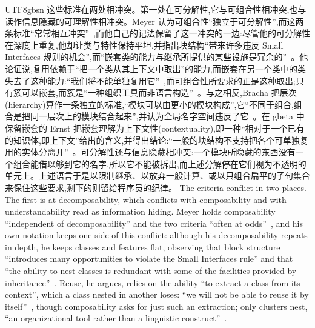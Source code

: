 \begin{CJK*}{UTF8}{gbsn}
这些标准在两处相冲突。第一处在可分解性,它与可组合性相冲突,也与读作信息隐藏的可理解性相冲突。Meyer 认为可组合性``独立于可分解性'',而这两条标准``常常相互冲突''~\cite[第~43~页]{meyer1997-object-oriented-software-construction},而他自己的记法保留了这一冲突的一边:尽管他的可分解性在深度上重复,他却让类与特性保持平坦,并指出块结构``带来许多违反 Small Interfaces 规则的机会'',而``嵌套类的能力与继承所提供的某些设施是冗余的''~\cite[第~49--50~页]{meyer1997-object-oriented-software-construction}。他论证说,复用依赖于``把一个类从其上下文中取出''的能力,而嵌套在另一个类中的类失去了这种能力:``我们将不能单独复用它''~\cite[第~209~页]{meyer1997-object-oriented-software-construction},而可组合性所要求的正是这种取出;只有簇可以嵌套,而簇是``一种组织工具而非语言构造''~\cite[第~50~页]{meyer1997-object-oriented-software-construction}。与之相反,Bracha 把层次(hierarchy)算作一条独立的标准,``模块可以由更小的模块构成'',它``不同于组合,组合是把同一层次上的模块结合起来'',并认为全局名字空间违反了它~\cite[第~13、16~页]{bracha1992-jigsaw-mixins}。在 gbeta 中保留嵌套的 Ernst 把嵌套理解为上下文性(contextuality),即一种``相对于一个已有的知识体,即上下文''给出的含义,并得出结论:``一般的块结构不支持把各个可单独复用的实体分离开''~\cite[第~104、117~页]{ernst1999-gbeta}。可分解性还与信息隐藏相冲突:一个模块所隐藏的东西没有一个组合能借以够到它的名字,所以它不能被拆出,而上述分解停在它们视为不透明的单元上。上述语言于是以限制继承、以放弃一般计算、或以只组合扁平的子句集合来保住这些要求,剩下的则留给程序员的纪律。
\else
The criteria conflict in two places.
The first is at decomposability, which conflicts with composability and with understandability read as
information hiding.
Meyer holds composability ``independent of decomposability'' and the two criteria ``often at
odds''~\cite[p.~43]{meyer1997-object-oriented-software-construction}, and his own notation keeps one side
of this conflict: although his decomposability repeats in depth, he keeps classes and features flat,
observing that block structure ``introduces many opportunities to violate the Small Interfaces rule''
and that ``the ability to nest classes is redundant with some of the facilities provided by
inheritance''~\cite[pp.~49--50]{meyer1997-object-oriented-software-construction}.
Reuse, he argues, relies on the ability ``to extract a class from its context'', which a class nested in
another loses: ``we will not be able to reuse it by
itself''~\cite[p.~209]{meyer1997-object-oriented-software-construction}, though composability asks for
just such an extraction; only clusters nest, ``an organizational tool rather than a
linguistic construct''~\cite[p.~50]{meyer1997-object-oriented-software-construction}.

\end{CJK*}
